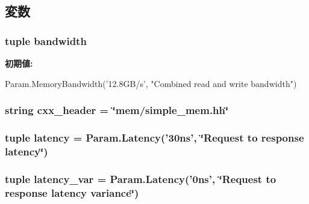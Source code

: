 \subsection{変数}
\hypertarget{classSimpleMemory_1_1SimpleMemory_a8ab981a84df29d9ad0abdebcf7f8c0b5}{
\subsubsection[{bandwidth}]{\setlength{\rightskip}{0pt plus 5cm}tuple {\bf bandwidth}}}
\label{classSimpleMemory_1_1SimpleMemory_a8ab981a84df29d9ad0abdebcf7f8c0b5}
{\bfseries 初期値:}
\begin{DoxyCode}
Param.MemoryBandwidth('12.8GB/s',
                                      "Combined read and write bandwidth")
\end{DoxyCode}
\hypertarget{classSimpleMemory_1_1SimpleMemory_a17da7064bc5c518791f0c891eff05fda}{
\subsubsection[{cxx\_\-header}]{\setlength{\rightskip}{0pt plus 5cm}string {\bf cxx\_\-header} = \char`\"{}mem/simple\_\-mem.hh\char`\"{}}}
\label{classSimpleMemory_1_1SimpleMemory_a17da7064bc5c518791f0c891eff05fda}
\hypertarget{classSimpleMemory_1_1SimpleMemory_ab6371bb71615c96debd0d27d34943fed}{
\subsubsection[{latency}]{\setlength{\rightskip}{0pt plus 5cm}tuple {\bf latency} = Param.Latency('30ns', \char`\"{}Request to response latency\char`\"{})}}
\label{classSimpleMemory_1_1SimpleMemory_ab6371bb71615c96debd0d27d34943fed}
\hypertarget{classSimpleMemory_1_1SimpleMemory_af62664fa3e093f2a1bd74450f562378f}{
\subsubsection[{latency\_\-var}]{\setlength{\rightskip}{0pt plus 5cm}tuple {\bf latency\_\-var} = Param.Latency('0ns', \char`\"{}Request to response latency variance\char`\"{})}}
